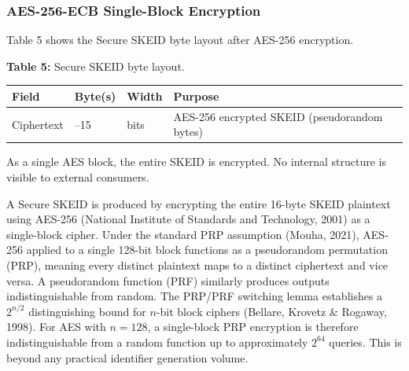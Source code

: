 \documentclass[fleqn,10pt,lineno]{wlpeerj}
\newcounter{none} %
\begin{document}
\subsubsection{AES-256-ECB Single-Block
Encryption}\label{aes-256-ecb-single-block-encryption}

Table 5 shows the Secure SKEID byte layout after AES-256 encryption.

\textbf{Table 5:} Secure SKEID byte layout.

{\def\LTcaptype{none} %
\begin{longtable}[]{@{}
  >{\raggedright\arraybackslash}p{}
  >{\raggedright\arraybackslash}p{}
  >{\raggedright\arraybackslash}p{}
  >{\raggedright\arraybackslash}p{}@{}}
\toprule\noalign{}
\begin{minipage}[b]{\linewidth}\raggedright
Field
\end{minipage} & \begin{minipage}[b]{\linewidth}\raggedright
Byte(s)
\end{minipage} & \begin{minipage}[b]{\linewidth}\raggedright
Width
\end{minipage} & \begin{minipage}[b]{\linewidth}\raggedright
Purpose
\end{minipage} \\
\midrule\noalign{}
\endhead
\bottomrule\noalign{}
\endlastfoot
Ciphertext & 0--15 & 128 bits & AES-256 encrypted SKEID (pseudorandom
bytes) \\
\end{longtable}
}

As a single AES block, the entire SKEID is encrypted. No internal
structure is visible to external consumers.

A Secure SKEID is produced by encrypting the entire 16-byte SKEID
plaintext using AES-256 (National Institute of Standards and Technology,
2001) as a single-block cipher. Under the standard PRP assumption
(Mouha, 2021), AES-256 applied to a single 128-bit block functions as a
pseudorandom permutation (PRP), meaning every distinct plaintext maps to
a distinct ciphertext and vice versa. A pseudorandom function (PRF)
similarly produces outputs indistinguishable from random. The PRP/PRF
switching lemma establishes a \(2^{n/2}\) distinguishing bound for
\(n\)-bit block ciphers (Bellare, Krovetz \& Rogaway, 1998). For AES
with \(n = 128\), a single-block PRP encryption is therefore
indistinguishable from a random function up to approximately \(2^{64}\)
queries. This is beyond any practical identifier generation volume.
\end{document}
